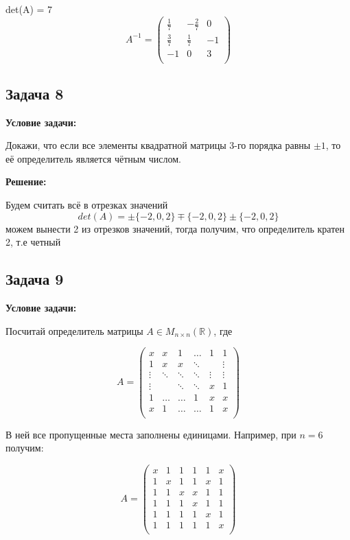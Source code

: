 \documentclass[a4paper,12pt]{article}
\begin{document}
det(A) = 7
\[
A^{-1} = \begin{pmatrix}
\frac{1}{7} & -\frac{2}{7} & 0 \\
\frac{3}{7} & \frac{1}{7} & -1 \\
-1 & 0 & 3 \\
\end{pmatrix}
\]

\vspace{1cm}

\subsection{Задача 8}

\textbf{Условие задачи:}

Докажи, что если все элементы квадратной матрицы 3-го порядка равны \( \pm1 \), то её определитель является чётным числом.

\textbf{Решение:}

Будем считать всё в отрезках значений
\[
det(A) = \pm\{-2, 0,  2\}\mp \{-2,  0, 2\}\pm \{-2,  0, 2\}
\] 
можем вынести 2 из отрезков значений, тогда получим, что определитель кратен 2, т.е четный
\vspace{1cm}

\subsection{Задача 9}

\textbf{Условие задачи:}

Посчитай определитель матрицы \( A \in M_{n \times n}(\mathbb{R}) \), где

\[
A = \begin{pmatrix}
x & x & 1 & \dots & 1 & 1 \\
1 & x & x & \ddots & & \vdots \\
\vdots & \ddots & \ddots & \ddots & \vdots & \vdots \\
\vdots & & \ddots & \ddots & x & 1 \\
1 & \dots & \dots & 1 & x & x \\
x & 1 & \dots & \dots & 1 & x \\
\end{pmatrix}
\]

В ней все пропущенные места заполнены единицами. Например, при \( n = 6 \) получим:

\[
A = \begin{pmatrix}
x & 1 & 1 & 1 & 1 & x \\
1 & x & 1 & 1 & x & 1 \\
1 & 1 & x & x & 1 & 1 \\
1 & 1 & 1 & x & 1 & 1 \\
1 & 1 & 1 & 1 & x & 1 \\
1 & 1 & 1 & 1 & 1 & x \\
\end{pmatrix}
\]
\end{document}
